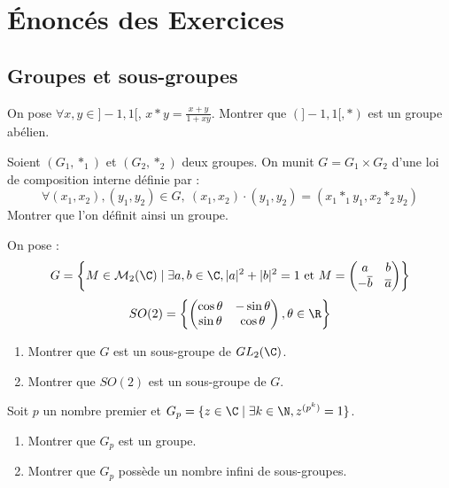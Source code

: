 \section{Énoncés des Exercices}
\subsection{Groupes et sous-groupes}

\begin{exercice}
    On pose $\forall x,y\in]-1,1[$, $x \ast y=\frac{x+y}{1+xy}$.
    Montrer que $(]-1,1[, \ast)$ est un groupe abélien.
\end{exercice}

\begin{exercice}
    Soient $(G_{1},*_{1})$ et $(G_{2},*_{2})$ deux groupes.
    On munit $G=G_{1}\times G_{2}$ d'une loi de composition interne définie par :
    \[\forall(x_{1},x_{2}), (y_{1}, y_{2}) \in G,~(x_{1}, x_{2}) \cdot (y_{1}, y_{2}) = (x_{1} *_{1} y_{1}, x_{2} *_{2} y_{2})\]
    Montrer que l'on définit ainsi un groupe.
\end{exercice}

\begin{exercice}
    On pose :
    \[G=\left\{M\in \mathcal{M}_{2}(\C) \mid \exists a,b\in\C, |a|^{2}+|b|^{2}=1 \text{ et } M=\begin{pmatrix}a&b\\ -\overline{b}&\overline{a}\end{pmatrix}\right\}\]
    \[SO(2)=\left\{\begin{pmatrix}\cos\theta&-\sin\theta\\ \sin\theta&\cos\theta\end{pmatrix}, \theta\in\R\right\}\]
    \begin{enumerate}
        \item Montrer que $G$ est un sous-groupe de $GL_{2}(\C)$.
        \item Montrer que $SO(2)$ est un sous-groupe de $G$.
    \end{enumerate}
\end{exercice}

\begin{exercice}
    Soit $p$ un nombre premier et $G_{p}=\{z\in\C \mid \exists k\in\N, z^{(p^{k})}=1\}$.
    \begin{enumerate}
        \item Montrer que $G_{p}$ est un groupe.
        \item Montrer que $G_{p}$ possède un nombre infini de sous-groupes.
    \end{enumerate}
\end{exercice}

